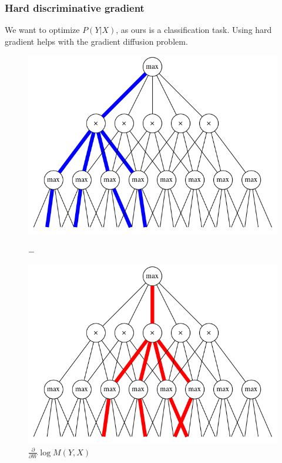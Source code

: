 \documentclass{beamer}
\newcommand{\ddspn}[2]{\frac{\partial#1}{\partial#2}}
\begin{document}
\begin{frame}
  \frametitle{Hard discriminative gradient}

  We want to optimize $P(Y|X)$, as ours is a classification task. Using hard gradient helps with
  the gradient diffusion problem.

  \begin{figure}[h]
    \centering
    \begin{minipage}{0.3\textwidth}
      \includegraphics[width=\linewidth]{imgs/hard_diff_0.png}
      \captionsetup{justification=centering}
      \caption*{$\ddspn{}{W}\log M(Y,X)$}
    \end{minipage}
    $-$
    \begin{minipage}{0.3\textwidth}
      \includegraphics[width=\linewidth]{imgs/hard_diff_1.png}

\end{minipage}
\end{figure}
\end{frame}
\end{document}
